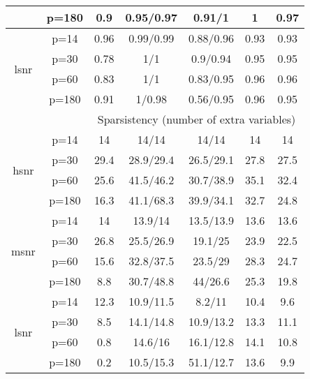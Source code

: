 \begin{table}[ht]
{\begin{tabular}{|c|c|ccccc|}
   & p=180 & 0.9 & 0.95/0.97 & 0.91/1 & 1 & 0.97 \\ 
  \midrule\multirow{4}[2]{*}{lsnr} & p=14 & 0.96 & 0.99/0.99 & 0.88/0.96 & 0.93 & 0.93 \\ 
   & p=30 & 0.78 & 1/1 & 0.9/0.94 & 0.95 & 0.95 \\ 
   & p=60 & 0.83 & 1/1 & 0.83/0.95 & 0.96 & 0.96 \\ 
   & p=180 & 0.91 & 1/0.98 & 0.56/0.95 & 0.96 & 0.95 \\ 
   \midrule 
 \multicolumn{1}{|c}{} &       & \multicolumn{5}{c|}{Sparsistency (number of extra variables)} \\
\midrule\multirow{4}[2]{*}{hsnr} & p=14 & 14 & 14/14 & 14/14 & 14 & 14 \\ 
   & p=30 & 29.4 & 28.9/29.4 & 26.5/29.1 & 27.8 & 27.5 \\ 
   & p=60 & 25.6 & 41.5/46.2 & 30.7/38.9 & 35.1 & 32.4 \\ 
   & p=180 & 16.3 & 41.1/68.3 & 39.9/34.1 & 32.7 & 24.8 \\ 
  \midrule\multirow{4}[2]{*}{msnr} & p=14 & 14 & 13.9/14 & 13.5/13.9 & 13.6 & 13.6 \\ 
   & p=30 & 26.8 & 25.5/26.9 & 19.1/25 & 23.9 & 22.5 \\ 
   & p=60 & 15.6 & 32.8/37.5 & 23.5/29 & 28.3 & 24.7 \\ 
   & p=180 & 8.8 & 30.7/48.8 & 44/26.6 & 25.3 & 19.8 \\ 
  \midrule\multirow{4}[2]{*}{lsnr} & p=14 & 12.3 & 10.9/11.5 & 8.2/11 & 10.4 & 9.6 \\ 
   & p=30 & 8.5 & 14.1/14.8 & 10.9/13.2 & 13.3 & 11.1 \\ 
   & p=60 & 0.8 & 14.6/16 & 16.1/12.8 & 14.1 & 10.8 \\ 
   & p=180 & 0.2 & 10.5/15.3 & 51.1/12.7 & 13.6 & 9.9 \\ 
   \bottomrule 
\end{tabular}
}
\end{table}
